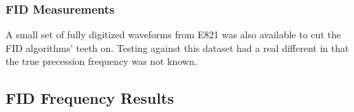 
\subsubsection{FID Measurements}
A small set of fully digitized waveforms from E821 was also available to cut the FID algorithms' teeth on.  Testing against this dataset had a real different in that the true precession frequency was not known.  


\subsection{FID Frequency Results}

